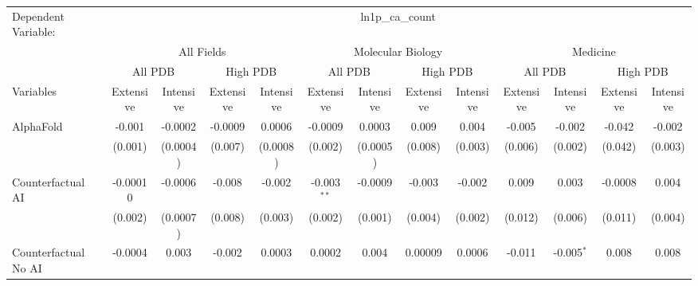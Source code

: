 \begingroup
\centering
\begin{tabular}{lcccccccccccc}
   \tabularnewline \midrule \midrule
   Dependent Variable: & \multicolumn{12}{c}{ln1p\_ca\_count}\\
 & \multicolumn{4}{c}{All Fields} & \multicolumn{4}{c}{Molecular Biology} & \multicolumn{4}{c}{Medicine} \\
\cmidrule(lr){2-5} \cmidrule(lr){6-9} \cmidrule(lr){10-13}
 & \multicolumn{2}{c}{All PDB} & \multicolumn{2}{c}{High PDB} & \multicolumn{2}{c}{All PDB} & \multicolumn{2}{c}{High PDB} & \multicolumn{2}{c}{All PDB} & \multicolumn{2}{c}{High PDB} \\
\cmidrule(lr){2-3} \cmidrule(lr){4-5} \cmidrule(lr){6-7} \cmidrule(lr){8-9} \cmidrule(lr){10-11} \cmidrule(lr){12-13}
Variables & \multicolumn{1}{c}{Extensive} & \multicolumn{1}{c}{Intensive} & \multicolumn{1}{c}{Extensive} & \multicolumn{1}{c}{Intensive} & \multicolumn{1}{c}{Extensive} & \multicolumn{1}{c}{Intensive} & \multicolumn{1}{c}{Extensive} & \multicolumn{1}{c}{Intensive} & \multicolumn{1}{c}{Extensive} & \multicolumn{1}{c}{Intensive} & \multicolumn{1}{c}{Extensive} & \multicolumn{1}{c}{Intensive} \\
\cmidrule(lr){1-1}\cmidrule(lr){2-2} \cmidrule(lr){3-3} \cmidrule(lr){4-4} \cmidrule(lr){5-5} \cmidrule(lr){6-6} \cmidrule(lr){7-7} \cmidrule(lr){8-8} \cmidrule(lr){9-9} \cmidrule(lr){10-10} \cmidrule(lr){11-11} \cmidrule(lr){12-12} \cmidrule(lr){13-13}
   AlphaFold                                & -0.001   & -0.0002  & -0.0009 & 0.0006   & -0.0009       & 0.0003       & 0.009   & 0.004    & -0.005      & -0.002       & -0.042  & -0.002\\   
                                            & (0.001)  & (0.0004) & (0.007) & (0.0008) & (0.002)       & (0.0005)     & (0.008) & (0.003)  & (0.006)     & (0.002)      & (0.042) & (0.003)\\   
   Counterfactual AI                        & -0.00010 & -0.0006  & -0.008  & -0.002   & -0.003$^{**}$ & -0.0009      & -0.003  & -0.002   & 0.009       & 0.003        & -0.0008 & 0.004\\   
                                            & (0.002)  & (0.0007) & (0.008) & (0.003)  & (0.002)       & (0.001)      & (0.004) & (0.002)  & (0.012)     & (0.006)      & (0.011) & (0.004)\\   
   Counterfactual No AI                     & -0.0004  & 0.003    & -0.002  & 0.0003   & 0.0002        & 0.004        & 0.00009 & 0.0006   & -0.011      & -0.005$^{*}$ & 0.008   & 0.008\\   

\end{tabular}
